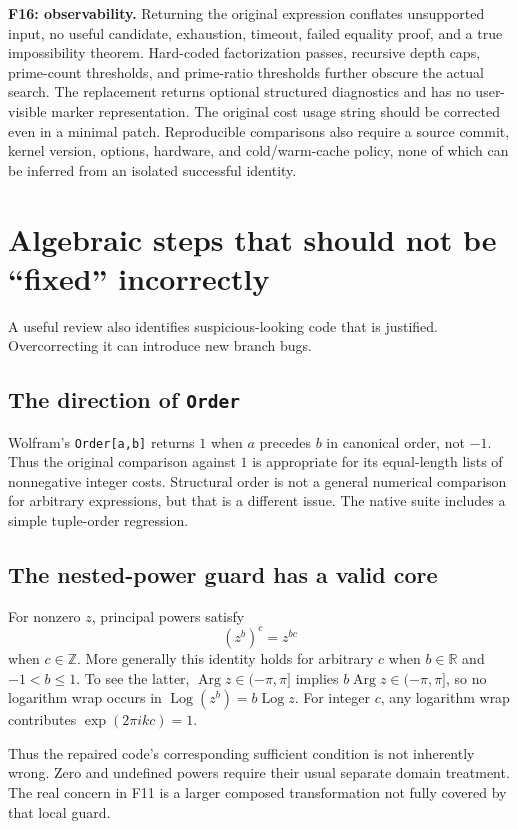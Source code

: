 \documentclass[11pt,letterpaper]{article}
\newcommand{\code}[1]{\texttt{#1}}
\newcommand{\R}{\mathbb R}
\newcommand{\Z}{\mathbb Z}
\DeclareMathOperator{\Arg}{Arg}
\DeclareMathOperator{\Log}{Log}
\theoremstyle{definition}
\begin{document}
\textbf{F16: observability.} Returning the original expression conflates unsupported input, no useful candidate, exhaustion, timeout, failed equality proof, and a true impossibility theorem. Hard-coded factorization passes, recursive depth caps, prime-count thresholds, and prime-ratio thresholds further obscure the actual search. The replacement returns optional structured diagnostics and has no user-visible marker representation. The original cost usage string should be corrected even in a minimal patch. Reproducible comparisons also require a source commit, kernel version, options, hardware, and cold/warm-cache policy, none of which can be inferred from an isolated successful identity.

\section{Algebraic steps that should not be ``fixed'' incorrectly}\label{sec:nobugs}

A useful review also identifies suspicious-looking code that is justified. Overcorrecting it can introduce new branch bugs.

\subsection{The direction of \texttt{Order}}

Wolfram's \code{Order[a,b]} returns $1$ when $a$ precedes $b$ in canonical order, not $-1$. Thus the original comparison against $1$ is appropriate for its equal-length lists of nonnegative integer costs. Structural order is not a general numerical comparison for arbitrary expressions, but that is a different issue. The native suite includes a simple tuple-order regression.\cite{order}

\subsection{The nested-power guard has a valid core}

For nonzero $z$, principal powers satisfy
\[
 (z^b)^c=z^{bc}
\]
when $c\in\Z$. More generally this identity holds for arbitrary $c$ when $b\in\R$ and $-1<b\le1$. To see the latter, $\Arg z\in(-\pi,\pi]$ implies $b\Arg z\in(-\pi,\pi]$, so no logarithm wrap occurs in $\Log(z^b)=b\Log z$. For integer $c$, any logarithm wrap contributes $\exp(2\pi i kc)=1$.

Thus the repaired code's corresponding sufficient condition is not inherently wrong. Zero and undefined powers require their usual separate domain treatment. The real concern in F11 is a larger composed transformation not fully covered by that local guard.
\end{document}
